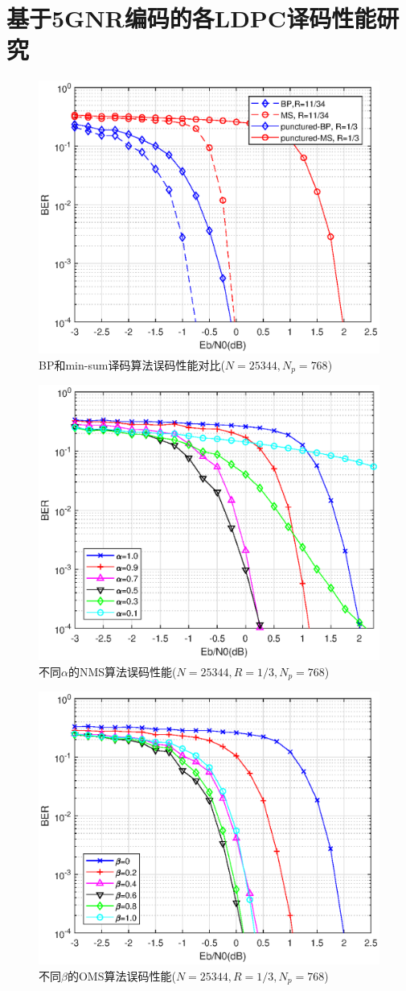 \documentclass{article}
\begin{document}
\section{基于5GNR编码的各LDPC译码性能研究}
\begin{figure}[H]
	\centering
	\includegraphics[width = .75\textwidth]{bp_ms_pun.eps}
	\caption{BP和min-sum译码算法误码性能对比($N=25344,N_p=768$)}
\end{figure}

\begin{figure}[H]
	\centering
	\includegraphics[width = .75\textwidth]{nms.eps}
	\caption{不同$\alpha$的NMS算法误码性能($N=25344,R=1/3,N_p=768$)}
\end{figure}

\begin{figure}[H]
	\centering
	\includegraphics[width = .75\textwidth]{oms.eps}
	\caption{不同$\beta$的OMS算法误码性能($N=25344,R=1/3,N_p=768$)}
\end{figure}
\end{document}
